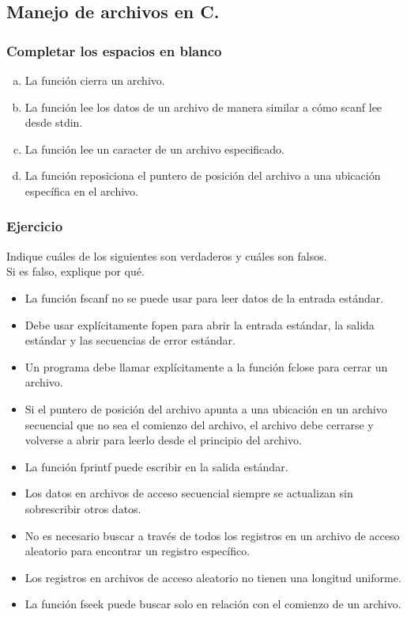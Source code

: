 \setcounter{subsection}{10}
\subsection*{Manejo de archivos en C.}

\subsubsection{Completar los espacios en blanco}
\begin{enumerate}[a)]
  \item La función \underspace cierra un archivo.
  \item La función \underspace lee los datos de un archivo de manera similar a cómo scanf lee desde stdin.
  \item La función \underspace lee un caracter de un archivo especificado.
  \item La función \underspace reposiciona el puntero de posición del archivo a una ubicación específica en el archivo.
\end{enumerate}
\subsubsection{Ejercicio}
Indique cuáles de los siguientes son verdaderos y cuáles son falsos.\\
Si es falso, explique por qué.
\begin{itemize}[a)]
  \item La función fscanf no se puede usar para leer datos de la entrada estándar.
  \item Debe usar explícitamente fopen para abrir la entrada estándar, la salida estándar y las secuencias de error estándar.
  \item Un programa debe llamar explícitamente a la función fclose para cerrar un archivo.
  \item Si el puntero de posición del archivo apunta a una ubicación en un archivo secuencial que no sea el comienzo del archivo, el archivo debe cerrarse y volverse a abrir para leerlo desde el principio del archivo.
  \item La función fprintf puede escribir en la salida estándar.
  \item Los datos en archivos de acceso secuencial siempre se actualizan sin sobrescribir otros datos.
  \item No es necesario buscar a través de todos los registros en un archivo de acceso aleatorio para encontrar un registro específico.
  \item Los registros en archivos de acceso aleatorio no tienen una longitud uniforme.
  \item La función fseek puede buscar solo en relación con el comienzo de un archivo.
\end{itemize}

